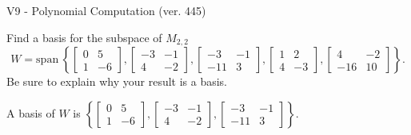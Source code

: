 \begin{exercise}
  \begin{exerciseTitle}V9 - Polynomial Computation (ver. 445)\end{exerciseTitle}
  \begin{exerciseStatement}
    Find a basis for the subspace of \(M_{2,2}\) 
\[W=\mathrm{span}\ \left\{\left[\begin{array}{cc}
0 & 5 \\
1 & -6
\end{array}\right] , \left[\begin{array}{cc}
-3 & -1 \\
4 & -2
\end{array}\right] , \left[\begin{array}{cc}
-3 & -1 \\
-11 & 3
\end{array}\right] , \left[\begin{array}{cc}
1 & 2 \\
4 & -3
\end{array}\right] , \left[\begin{array}{cc}
4 & -2 \\
-16 & 10
\end{array}\right]\right\}.\]
 Be sure to explain why your result is a basis.


  \end{exerciseStatement}
  \begin{exerciseAnswer}
   A basis of \(W\) is  \(\left\{\left[\begin{array}{cc}
0 & 5 \\
1 & -6
\end{array}\right] , \left[\begin{array}{cc}
-3 & -1 \\
4 & -2
\end{array}\right] , \left[\begin{array}{cc}
-3 & -1 \\
-11 & 3
\end{array}\right]\right\}\).
  


  \end{exerciseAnswer}
\end{exercise}
